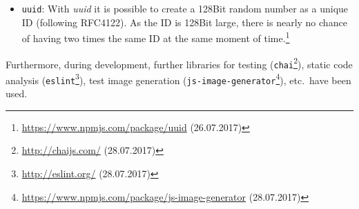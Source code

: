 \begin{itemize}
	\begin{lstlisting}[caption={In the above example from the backend an extract from the 'upload' method for images is shown. The image is scaled to three different sizes and those are then lateron stored in the S3 storage.}, label=lst:sharp]
		const buffers = await Promise.all([
			sharp(path)
				.resize(200, 200)
				.max()
				.toFormat('jpeg')
				.toBuffer(),
			sharp(path)
				.resize(500, 500)
				.max()
				.toFormat('jpeg')
				.toBuffer(),
			sharp(path)
				.resize(1920, 1080)
				.max()
				.toFormat('jpeg')
				.toBuffer()
		]);
		const small = buffers[0];
		const middle = buffers[1];
		const large = buffers[2];
	\end{lstlisting}
	\item \texttt{uuid}: With \textit{uuid} it is possible to create a 128Bit random number as a unique ID (following RFC4122). As the ID is 128Bit large, there is nearly no chance of having two times the same ID at the same moment of time.\footnote{\url{https://www.npmjs.com/package/uuid} (26.07.2017)}
\end{itemize}
Furthermore, during development, further libraries for testing (\texttt{chai}\footnote{\url{http://chaijs.com/} (28.07.2017)}), static code analysis (\texttt{eslint}\footnote{\url{http://eslint.org/} (28.07.2017)}), test image generation (\texttt{js-image-generator}\footnote{\url{https://www.npmjs.com/package/js-image-generator} (28.07.2017)}), etc.\ have been used.
